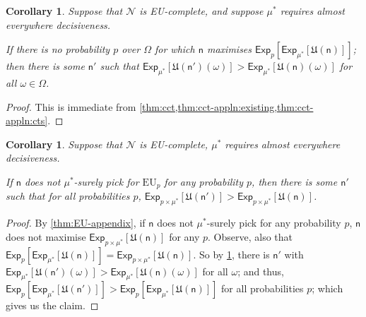 \documentclass[a4paper,final]{article}
\newtheorem{corollary}[theorem]{Corollary}
\newcommand\Exp{\mathsf{Exp}}
\newcommand\EU{\mathrm{EU}}
\newcommand\U{\mathfrak{U}} %
\newcommand{\n}{\mathsf{n}}
\newcommand\Nu{\mathcal{N}}
\newenvironment{CCM rewritten}
{\begingroup\color{blue}} %
{\endgroup}              %
\begin{document}
\begin{corollary}\label{thm:cct-applns:corr}
	Suppose that $\Nu$ is EU-complete, and suppose $\mu^*$ requires almost everywhere decisiveness. 
	
	
	If there is no probability $p$ over $\Omega$ for which $\n$ maximises $\Exp_{p}[\Exp_{\mu^*}[\U(\n)]]$; then there is some $\n'$ such that $\Exp_{\mu^*}[\U(\n')(\omega)]>\Exp_{\mu^*}[\U(\n)(\omega)]$ for all $\omega\in\Omega$. 
\end{corollary}
\begin{proof}
	This is immediate from \cref{thm:cct,thm:cct-appln:existing,thm:cct-appln:cts}.
\end{proof}
\begin{corollary}\label{cor:max-dom}
		Suppose that $\Nu$ is EU-complete, $\mu^*$ requires almost everywhere decisiveness. %
		
	If $\n$ does not $\mu^*$-surely pick for $\EU_p$ for any probability $p$, then there is some $\n'$ such that for all probabilities $p$, $\Exp_{p\times\mu^*}[\U(\n')]>\Exp_{p\times\mu^*}[\U(\n)]$. 
\end{corollary}
\begin{proof}
	By \cref{thm:EU-appendix}, if $\n$ does not $\mu^*$-surely pick for any probability $p$, $\n$ does not maximise $\Exp_{p\times\mu^*}[\U(\n)]$ for any $p$. Observe, also that $\Exp_p[\Exp_{\mu^*}[\U(\n)]]=\Exp_{p\times\mu^*}[\U(\n)]$. So by \cref{thm:cct-applns:corr}, there is $\n'$ with  $\Exp_{\mu^*}[\U(\n')(\omega)]>\Exp_{\mu^*}[\U(\n)(\omega)]$ for all $\omega$; and thus, $\Exp_{p}[\Exp_{\mu^*}[\U(\n')]]>\Exp_p[\Exp_{\mu^*}[\U(\n)]]$ for all probabilities $p$; which gives us the claim.
\end{proof}
\end{document}
